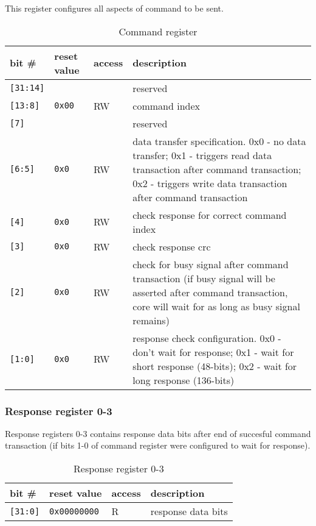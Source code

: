     This register configures all aspects of command to be sent.
    
    \begin{table}[H]
    \caption{Command register}
        \begin{tabular}{m{1.3cm}|m{2cm}|m{1cm}|m{8cm}}
                \rowcolor[gray]{0.7} bit \# & reset value & access & description \\ \hline \hline
                \texttt{[31:14]} & &  & reserved \\ \hline
                \texttt{[13:8]} & \texttt{0x00} & RW & command index \\ \hline
                \texttt{[7]} & & & reserved \\ \hline
                \texttt{[6:5]} & \texttt{0x0} & RW & data transfer specification. 0x0 - no data transfer; 0x1 - triggers read data transaction after command transaction;
                0x2 - triggers write data transaction after command transaction\\ \hline
                \texttt{[4]} & \texttt{0x0} & RW & check response for correct command index \\ \hline
                \texttt{[3]} & \texttt{0x0} & RW & check response crc \\ \hline
                \texttt{[2]} & \texttt{0x0} & RW & check for busy signal after command transaction (if busy signal will be asserted after command transaction, 
                core will wait for as long as busy signal remains) \\ \hline
                \texttt{[1:0]} & \texttt{0x0} & RW & response check configuration. 0x0 - don't wait for response; 0x1 - wait for short response (48-bits);
                0x2 - wait for long response (136-bits) \\ \hline
                \hline
        \end{tabular}
        \label{tab:cmd_reg}
    \end{table}
    
    \subsubsection{Response register 0-3}
    \label{sec:resp_reg}
    
    Response registers 0-3 contains response data bits after end of succesful command transaction (if bits 1-0 of command register were configured to wait for response).
    
    \begin{table}[H]
    \caption{Response register 0-3}
        \begin{tabular}{m{1.3cm}|m{2cm}|m{1cm}|m{8cm}}
                \rowcolor[gray]{0.7} bit \# & reset value & access & description \\ \hline \hline
                \texttt{[31:0]} & \texttt{0x00000000} & R & response data bits \\ \hline
                \hline
        \end{tabular}
        \label{tab:resp_reg}
    \end{table}
    
